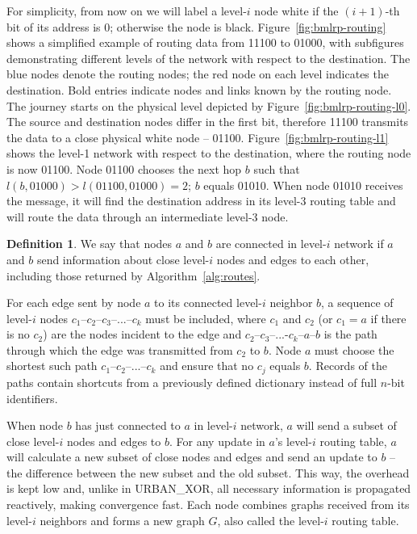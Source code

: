 \documentclass[conference]{IEEEtran}
\theoremstyle{definition}
\newtheorem{defn}{Definition}
\newcommand{\urbanxor}{URBAN\_XOR}
\begin{document}
For simplicity, from now on we will label a level-$i$ node white if the $(i+1)$-th bit of its address is 0; otherwise the node is black. Figure~\ref{fig:bmlrp-routing} shows a simplified example of routing data from 11100 to 01000, with subfigures demonstrating different levels of the network with respect to the destination. The blue nodes denote the routing nodes; the red node on each level indicates the destination. Bold entries indicate nodes and links known by the routing node. The journey starts on the physical level depicted by Figure~\ref{fig:bmlrp-routing-l0}. The source and destination nodes differ in the first bit, therefore 11100 transmits the data to a close physical white node -- 01100. Figure~\ref{fig:bmlrp-routing-l1} shows the level-1 network with respect to the destination, where the routing node is now 01100. Node 01100 chooses the next hop $b$ such that $l(b, 01000) > l(01100, 01000) = 2$; $b$ equals 01010. When node 01010 receives the message, it will find the destination address in its level-3 routing table 
and will route the data through an intermediate level-3 node.

\begin{defn}
    We say that nodes $a$ and $b$ are connected in level-$i$ network if $a$ and $b$ send information about close level-$i$ nodes and edges to each other, including those returned by Algorithm~\ref{alg:routes}.
    
    \label{defn:connected}
\end{defn}

For each edge sent by node $a$ to its connected level-$i$ neighbor $b$, a sequence of level-$i$ nodes $c_1$--$c_2$--$c_3$--...--$c_k$ must be included, where $c_1$ and $c_2$ (or $c_1 = a$ if there is no $c_2$) are the nodes incident to the edge and $c_2$--$c_3$--...-$c_k$--$a$--$b$ is the path through which the edge was transmitted from $c_2$ to $b$. Node $a$ must choose the shortest such path $c_1$--$c_2$--...--$c_k$ and ensure that no $c_j$ equals $b$. Records of the paths contain shortcuts from a previously defined dictionary instead of full $n$-bit identifiers.

When node $b$ has just connected to $a$ in level-$i$ network, $a$ will send a subset of close level-$i$ nodes and edges to $b$. For any update in $a$'s level-$i$ routing table, $a$ will calculate a new subset of close nodes and edges and send an update to $b$ -- the difference between the new subset and the old subset. This way, the overhead is kept low and, unlike in \urbanxor, all necessary information is propagated reactively, making convergence fast. Each node combines graphs received from its level-$i$ neighbors and forms a new graph $G$, also called the level-$i$ routing table.
\end{document}
